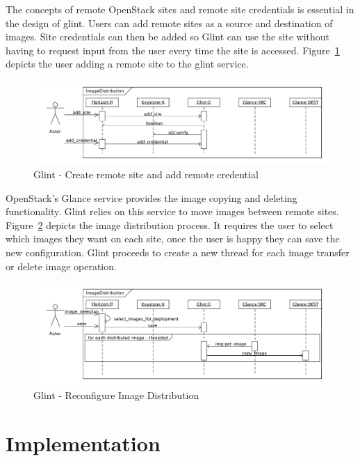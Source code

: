 \documentclass[a4paper]{jpconf}
\begin{document}
The concepts of remote OpenStack sites and remote site credentials is essential in the design of glint. Users can add remote sites as a source and destination of images. Site credentials can then be added so Glint can use the site without having to request input from the user every time the site is accessed. Figure~\ref{fig:glintsitecred} depicts the user adding a remote site to the glint service.

\begin{figure}[H]
\begin{center}
\includegraphics[width=36pc]{images/glintsitecred.pdf}
\caption{\label{fig:glintsitecred}Glint - Create remote site and add remote credential}
\end{center}
\end{figure}

OpenStack's Glance service provides the image copying and deleting functionality. Glint relies on this service to move images between remote sites. Figure~\ref{fig:glintdist} depicts the image distribution process. It requires the user to select which images they want on each site, once the user is happy they can save the new configuration. Glint proceeds to create a new thread for each image transfer or delete image operation. 

\begin{figure}[H]
\begin{center}
\includegraphics[width=36pc]{images/glintdist.pdf}
\caption{\label{fig:glintdist}Glint - Reconfigure Image Distribution}
\end{center}
\end{figure}

\section{Implementation}
\end{document}

